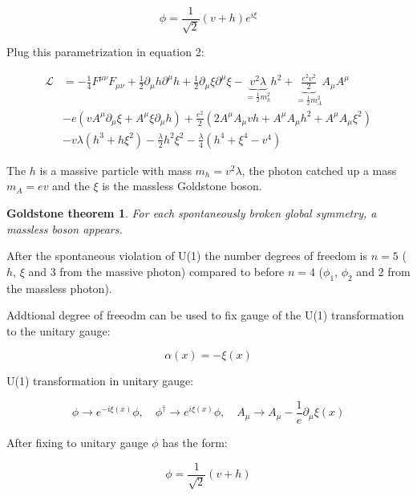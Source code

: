 \documentclass[12pt,oneside]{book}
\newtheorem*{goldstone}{Goldstone theorem}
\begin{document}
\begin{equation}
    \phi = \frac{1}{\sqrt{2}}(v + h)e^{i\xi}
\end{equation}

Plug this parametrization in equation 2:

\begin{align}
    \mathcal{L} &= -\frac{1}{4}F^{\mu\nu}F_{\mu\nu} + \frac{1}{2}\partial_\mu h\partial^{\mu}h + \frac{1}{2}\partial_\mu\xi\partial^{\mu}\xi - \underbrace{v^2\lambda}_{=\frac{1}{2}m_h^2}h^2 + \underbrace{\frac{e^2v^2}{2}}_{=\frac{1}{2}m^2_A}A_\mu A^\mu \\ 
                &- e(vA^\mu\partial_\mu\xi + A^\mu\xi\partial_\mu h) + \frac{e^2}{2}(2A^\mu A_\mu vh + A^\mu A_\mu h^2 + A^\mu A_\mu \xi^2) \nonumber \\
                &- v\lambda(h^3 + h\xi^2) - \frac{\lambda}{2}h^2\xi^2 - \frac{\lambda}{4}(h^4 + \xi^4 -v^4) \nonumber
\end{align}

The $h$ is a massive particle with mass $m_h = v^2\lambda$, the photon catched up a mass $m_A = ev$ and the $\xi$ is the massless Goldstone boson. 

\begin{goldstone}
    For each spontaneously broken global symmetry, a massless boson appears.
\end{goldstone}

After the spontaneous violation of U(1) the number degrees of freedom is $n = 5$ ($h$, $\xi$ and 3 from the massive photon) compared to before $n = 4$ ($\phi_1$, $\phi_2$ and 2 from the massless photon). \newline

Addtional degree of freeodm can be used to fix gauge of the U(1) transformation to the unitary gauge:

\begin{equation}   
    \alpha(x) = - \xi(x)
\end{equation}

U(1) transformation in unitary gauge:

\begin{equation}
    \phi \to e^{-i\xi(x)}\phi, \quad \phi^{\dagger} \to e^{i\xi(x)}\phi, \quad A_\mu \to A_\mu - \frac{1}{e}\partial_\mu{\xi(x)}
\end{equation}

After fixing to unitary gauge $\phi$ has the form:

\begin{equation}
    \phi = \frac{1}{\sqrt{2}}(v + h)
\end{equation}
\end{document}
